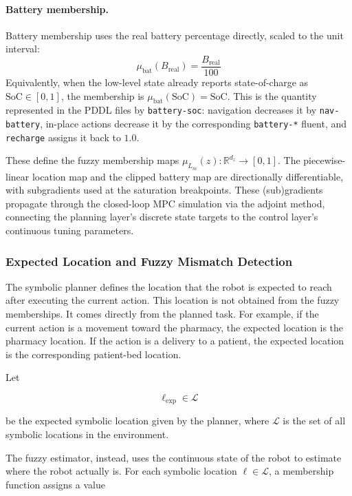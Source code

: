 \documentclass{article}
\begin{document}
\paragraph{Battery membership.}
Battery membership uses the real battery percentage directly, scaled to the unit interval:
\begin{equation}
\mu_{\mathrm{bat}}(B_{\mathrm{real}}) = \frac{B_{\mathrm{real}}}{100}\end{equation}
Equivalently, when the low-level state already reports state-of-charge as $\text{SoC}\in[0,1]$, the membership is $\mu_{\mathrm{bat}}(\text{SoC})=\text{SoC}$. This is the quantity represented in the PDDL files by \texttt{battery-soc}: navigation decreases it by \texttt{nav-battery}, in-place actions decrease it by the corresponding \texttt{battery-*} fluent, and \texttt{recharge} assigns it back to $1.0$.



These define the fuzzy membership maps $\mu_{L_m}(z): \mathbb{R}^{d_z} \to [0,1]$. The piecewise-linear location map and the clipped battery map are directionally differentiable, with subgradients used at the saturation breakpoints. These (sub)gradients propagate through the closed-loop MPC simulation via the adjoint method, connecting the planning layer's discrete state targets to the control layer's continuous tuning parameters.


\subsubsection{Expected Location and Fuzzy Mismatch Detection}

The symbolic planner defines the location that the robot is expected to reach after executing the current action. This location is not obtained from the fuzzy memberships. It comes directly from the planned task. For example, if the current action is a movement toward the pharmacy, the expected location is the pharmacy location. If the action is a delivery to a patient, the expected location is the corresponding patient-bed location.

Let

\[
\ell_{\mathrm{exp}} \in \mathcal{L}
\]

be the expected symbolic location given by the planner, where \(\mathcal{L}\) is the set of all symbolic locations in the environment.

The fuzzy estimator, instead, uses the continuous state of the robot to estimate where the robot actually is. For each symbolic location \(\ell \in \mathcal{L}\), a membership function assigns a value
\end{document}
